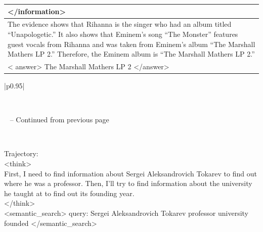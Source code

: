 \documentclass[11pt]{article}
\begin{document}
\begin{longtable}{|p{}|}
\textless{}/information\textgreater{} \\
\hline
The evidence shows that Rihanna is the singer who had an album titled ``Unapologetic.'' It also shows that Eminem's song ``The Monster'' features guest vocals from Rihanna and was taken from Eminem's album ``The Marshall Mathers LP 2.'' Therefore, the Eminem album is ``The Marshall Mathers LP 2.'' \\
\hline
\textless{} answer\textgreater{} The Marshall Mathers LP 2 \textless{}/answer\textgreater{} \\
\end{longtable}

\begin{longtable}{|p{}|}
\caption{Another trajectory of GRASP.}\label{tab:grasp_rus} \\
\hline
\endfirsthead

%
{{\tablename\ \thetable{} -- Continued from previous page}} \\
\hline
\endhead

\hline {} \\
\endfoot

\hline
\endlastfoot

Trajectory: \\
\textless{}think\textgreater{} \\
First, I need to find information about Sergei Aleksandrovich Tokarev to find out where he was a professor. Then, I'll try to find information about the university he taught at to find out its founding year. \\
\textless{}/think\textgreater{} \\
\textless{}semantic\_search\textgreater{} query: Sergei Aleksandrovich Tokarev professor university founded \textless{}/semantic\_search\textgreater{} \\
\hline


\end{longtable}
\end{document}
